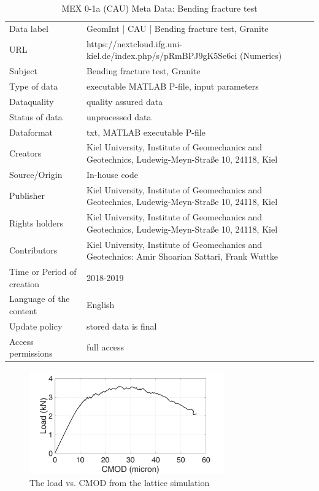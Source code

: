 \begin{table}[!ht]
\caption{MEX 0-1a (CAU) Meta Data: Bending fracture test}
\label{tab:dms-mex0-1a}
\small
\begin{tabular}{R{2.75cm}|L{8.5cm}}
\hline
%
Data label & GeomInt | CAU | Bending fracture test, Granite \\
URL &  https://nextcloud.ifg.uni-kiel.de/index.php/s/pRmBPJ9gK5Se6ci (Numerics)\\
Subject  &  Bending fracture test, Granite\\
Type of data  &  executable MATLAB P-file, input parameters\\
Dataquality  &  quality assured data \\
Status of data  &  unprocessed data\\
Dataformat  & txt, MATLAB executable P-file\\
Creators  &  Kiel University, Institute of Geomechanics and Geotechnics, Ludewig-Meyn-Stra\ss e 10, 24118, Kiel\\
Source/Origin & In-house code \\
Publisher  &  Kiel University, Institute of Geomechanics and Geotechnics, Ludewig-Meyn-Stra\ss e 10, 24118, Kiel \\
Rights holders &  Kiel University, Institute of Geomechanics and Geotechnics, Ludewig-Meyn-Stra\ss e 10, 24118, Kiel \\
Contributors &   Kiel University, Institute of Geomechanics and Geotechnics: Amir Shoarian Sattari, Frank Wuttke\\
Time or Period of creation &  2018-2019\\
Language of the content &  English\\
Update policy &  stored data is final\\
Access permissions & full access\\
%
\hline
\end{tabular}
\end{table}

\begin{figure}[!ht]
\centering
\includegraphics[width=0.75\textwidth]{figures/Amir_ME1_LEM_Displacement_Crystalline_Data.png}
\caption{The load vs. CMOD from the lattice simulation}
\label{fig:Amir_ME1_LEM_Displacement_Crystalline_Data}
\end{figure}

